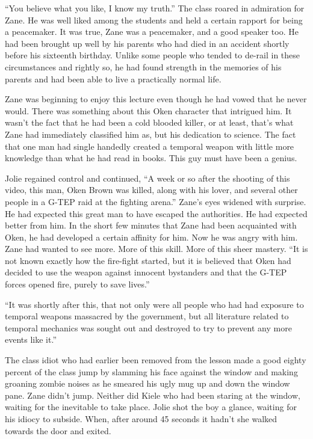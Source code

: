 ``You believe what you like, I know my truth.''  The class roared in admiration for Zane.  He was well liked among the students and held a certain rapport for being a peacemaker.  It was true, Zane was a peacemaker, and a good speaker too.  He had been brought up well by his parents who had died in an accident shortly before his sixteenth birthday.  Unlike some people who tended to de-rail in these circumstances and rightly so, he had found strength in the memories of his parents and had been able to live a practically normal life.

Zane was beginning to enjoy this lecture even though he had vowed that he never would.  There was something about this Oken character that intrigued him.  It wasn't the fact that he had been a cold blooded killer, or at least, that's what Zane had immediately classified him as, but his dedication to science.  The fact that one man had single handedly created a temporal weapon with little more knowledge than what he had read in books.  This guy must have been a genius.

Jolie regained control and continued, ``A week or so after the shooting of this video, this man, Oken Brown was killed, along with his lover, and several other people in a G-TEP raid at the fighting arena.''  Zane's eyes widened with surprise.  He had expected this great man to have escaped the authorities.  He had expected better from him.  In the short few minutes that Zane had been acquainted with Oken, he had developed a certain affinity for him.  Now he was  angry with him.  Zane had wanted to see more.  More of this skill.  More of this sheer mastery.  ``It is not known exactly how the fire-fight started, but it is believed that Oken had decided to use the weapon against innocent bystanders and that the G-TEP forces opened fire, purely to save lives.''

``It was shortly after this, that not only were all people who had had exposure to temporal weapons massacred by the government, but all literature related to temporal mechanics was sought out and destroyed to try to prevent any more events like it.''

The class idiot who had earlier been removed from the lesson made a good eighty percent of the class jump by slamming his face against the window and making groaning zombie noises as he smeared his ugly mug up and down the window pane.  Zane didn't jump.  Neither did Kiele who had been staring at the window, waiting for the inevitable to take place.  Jolie shot the boy a glance, waiting for his idiocy to subside.  When, after around 45 seconds it hadn't she walked towards the door and exited.

